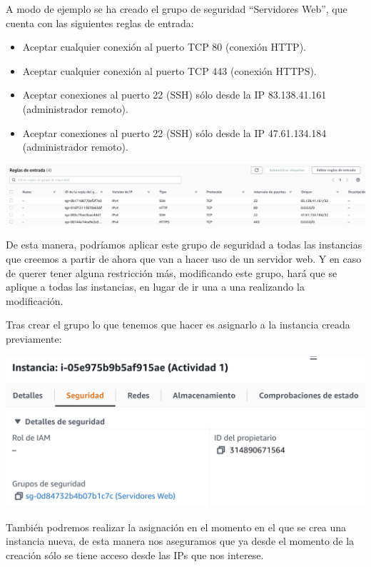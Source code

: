 \documentclass{\ClassPath/viu-tfm-template}
\begin{document}
A modo de ejemplo se ha creado el grupo de seguridad “Servidores Web”, que cuenta con las siguientes reglas de entrada:
\begin{itemize}
    \item Aceptar cualquier conexión al puerto TCP 80 (conexión HTTP).
    \item Aceptar cualquier conexión al puerto TCP 443 (conexión HTTPS).
    \item Aceptar conexiones al puerto 22 (SSH) sólo desde la IP 83.138.41.161 (administrador remoto).
    \item Aceptar conexiones al puerto 22 (SSH) sólo desde la IP 47.61.134.184 (administrador remoto).
\end{itemize}

\begin{center}
    \includegraphics[frame,width=\linewidth]{img/grupos.png}
\end{center}

De esta manera, podríamos aplicar este grupo de seguridad a todas las instancias que creemos a partir de ahora que van a hacer uso de un servidor web. Y en caso de querer tener alguna restricción más, modificando este grupo, hará que se aplique a todas las instancias, en lugar de ir una a una realizando la modificación.

Tras crear el grupo lo que tenemos que hacer es asignarlo a la instancia creada previamente:

\begin{center}
    \includegraphics[frame,width=0.7\linewidth]{img/grupos2.png}
\end{center}

También podremos realizar la asignación en el momento en el que se crea una instancia nueva, de esta manera nos aseguramos que ya desde el momento de la creación sólo se tiene acceso desde las IPs que nos interese.
\end{document}
